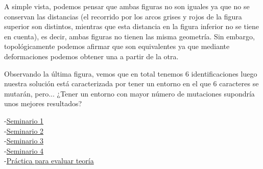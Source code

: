 A simple vista, podemos pensar que ambas figuras no son iguales ya que no se conservan las distancias (el recorrido por los arcos grises y rojos de la figura superior son distintos, mientras que esta distancia en la figura inferior no se tiene en cuenta), es decir, ambas figuras no tienen las misma geometría.
Sin embargo, topológicamente podemos afirmar que son equivalentes ya que mediante deformaciones podemos obtener una a partir de la otra.

Observando la última figura, vemos que en total tenemos 6 identificaciones luego nuestra solución está caracterizada por tener un entorno en el que 6 caracteres se mutarán, pero... ¿Tener un entorno con mayor número de mutaciones supondría unos mejores resultados?






\newpage
\begin{thebibliography}{X} 
	
-\href{https://sci2s.ugr.es/sites/default/files/files/Teaching/GraduatesCourses/Metaheuristicas/Sem01-Problemas-MHs-2019-20.pdf}{Seminario 1}\\
	
	-\href{https://sci2s.ugr.es/sites/default/files/files/Teaching/GraduatesCourses/Metaheuristicas/Sem02-Problemas-BusquedaLocal-MHs-19-20.pdf}{Seminario 2}\\
	
		-\href{https://sci2s.ugr.es/sites/default/files/Sem03-Problemas-Poblaciones-MHs-19-20.pdf}{Seminario 3}\\
		
		-\href{https://sci2s.ugr.es/sites/default/files/files/Teaching/GraduatesCourses/Metaheuristicas/Sem04-Problemas-Trayectorias-MHs-19-20.pdf}{Seminario 4}\\
	
	-\href{https://sci2s.ugr.es/sites/default/files/files/Teaching/GraduatesCourses/Metaheuristicas/MHs\%20-\%20Pr\%C3\%A1ctica-4-Para-evaluaci\%C3\%B3n-teoria-Junio-2020.pdf}{Práctica para evaluar teoría}




\end{thebibliography}




